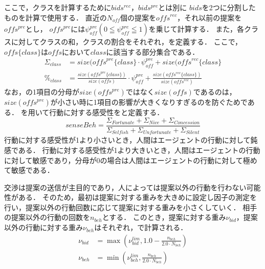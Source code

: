 ここで，クラスを計算するために$bids^{rec}$，$bids^{pre}$とは別に
$bids$を2つに分割したものを計算で使用する．
直近の$N_{\mathit{off}}$個の提案を$\mathit{offs}^{rec}$，それ以前の提案を$\mathit{offs}^{pre}$とし，
$\mathit{offs}^{pre}$には$\psi_{\mathit{off}}^{pre}(0 \leqq \psi_{\mathit{off}}^{pre} \leqq 1)$を乗じて計算する．
また，各クラスに対してクラスの和，クラスの割合をそれぞれ，を定義する．
ここで，$\mathit{offs}\{class\}$は$\mathit{offs}$において$class$に該当する部分集合である．
\begin{align}
    \Sigma_{class} &= size(\mathit{offs}^{pre}\{class\} \cdot \psi_{\mathit{off}}^{pre} + size(\mathit{offs}^{rec}\{class\} \label{eq:classSum} \\
    \%_{class} &= \frac{size(\mathit{offs}^{pre}\{class\})}{size(\mathit{offs})} \cdot \psi_{\mathit{off}}^{pre} + \frac{size(\mathit{offs^{rec}}\{class\})}{size(\mathit{offs}^{rec})} 
    \label{eq:classRate}
\end{align}
なお，の1項目の分母が$size(\mathit{offs}^{pre})$ではなく$size(\mathit{offs})$であるのは，
$size(\mathit{offs}^{pre})$が小さい時に1項目の影響が大きくなりすぎるのを防ぐためである．
を用いて行動に対する感受性をと定義する．
\begin{equation}
    senseBeh = \frac{\Sigma_{Fortunate} + \Sigma_{Nice} + \Sigma_{Concession}}{\Sigma_{\mathit{Selfish}} + \Sigma_{\mathit{Unfortunate}} + \Sigma_{Silent}} 
    \label{eq:sensebeh}
\end{equation}
行動に対する感受性が1より小さいとき，人間はエージェントの行動に対して鈍感である．
行動に対する感受性が1より大きいとき，人間はエージェントの行動に対して敏感であり，分母が0の場合は人間はエージェントの行動に対して極めて敏感である．

交渉は提案の送信が主目的であり，人によっては提案以外の行動を行わない可能性がある．
そのため，最初は提案に対する重みを大きめに設定し因子の測定を行い，提案以外の行動回数に応じて提案に対する重みを小さくしていく．
相手の提案以外の行動の回数を$n_{beh}$とする．
このとき，提案に対する重み$\nu_{\mathit{bid}}$，提案以外の行動に対する重み$\nu_{beh}$はそれぞれ，で計算される．
\begin{align}
    \nu_{\mathit{bid}} &= \max \left( \nu_{\mathit{bid}}^{lim}, 1.0 - \frac{n_{beh}}{2.0 \cdot N_{beh}} \right) \label{eq:offW} \\
    \nu_{beh} &= \min \left( \nu_{beh}^{lim}, \frac{n_{beh}}{2.0 \cdot N_{beh}} \right) \label{eq:behW} 
\end{align}

